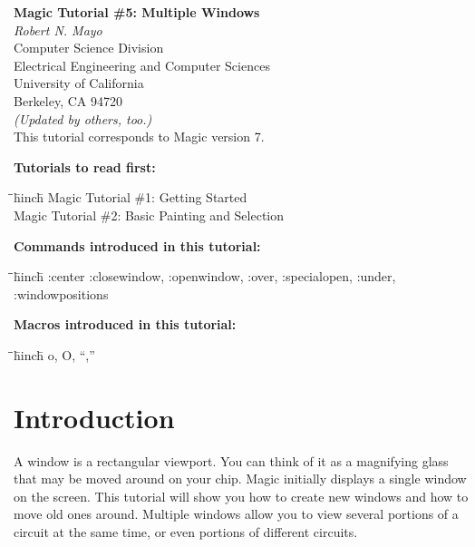 \documentclass[letterpaper,twoside,12pt]{article}
\def\hinch{\hspace*{0.5in}}
\def\starti{\begin{center}\begin{tabbing}\hinch\=\hinch\=\hinch\=hinch\hinch\=\kill}
\def\endi{\end{tabbing}\end{center}}
\def\mytitle{Magic Tutorial \#5: Multiple Windows}
\begin{document}
\makeatletter
\newcommand{\ps@magic}{%
	\renewcommand{\@oddhead}{\mytitle\hfil\today}%
	\renewcommand{\@evenhead}{\today\hfil\mytitle}%
	\renewcommand{\@evenfoot}{\hfil\textrm{--{\thepage}--}\hfil}%
	\renewcommand{\@oddfoot}{\@evenfoot}}
\newcommand{\ps@mplain}{%
	\renewcommand{\@oddhead}{}%
	\renewcommand{\@evenhead}{}%
	\renewcommand{\@evenfoot}{\hfil\textrm{--{\thepage}--}\hfil}%
	\renewcommand{\@oddfoot}{\@evenfoot}}
\makeatother
\pagestyle{magic}
\thispagestyle{mplain}


\begin{center}
  {\bfseries \Large \mytitle} \\
  \vspace*{0.5in}
  {\itshape Robert N. Mayo} \\
  \vspace*{0.5in}
   Computer Science Division \\
   Electrical Engineering and Computer Sciences \\
   University of California \\
   Berkeley, CA  94720 \\
  \vspace*{0.25in}
  {\itshape (Updated by others, too.)} \\
  \vspace*{0.25in}
  This tutorial corresponds to Magic version 7. \\
\end{center}
\vspace*{0.5in}

{\noindent\bfseries\large Tutorials to read first:}
\starti
   \> Magic Tutorial \#1: Getting Started \\
   \> Magic Tutorial \#2: Basic Painting and Selection
\endi

{\noindent\bfseries\large Commands introduced in this tutorial:}
\starti
   \> :center :closewindow, :openwindow, :over, :specialopen, :under,
	:windowpositions
\endi

{\noindent\bfseries\large Macros introduced in this tutorial:}

\starti
   \> o, O, ``,''
\endi

\vspace*{0.75in}
\section{Introduction}

A window is a rectangular viewport.
You can think of it as a magnifying glass that may be moved around
on your chip.
Magic initially displays a single window on the screen.  
This tutorial will show you how
to create new windows and how to move old ones around.
Multiple windows allow you
to view several portions of a circuit at the same time, or even
portions of different circuits.  
\end{document}
